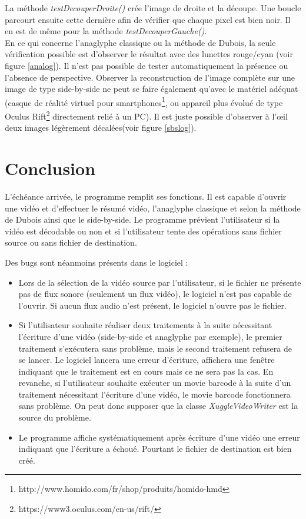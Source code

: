 \documentclass[10pt,a4paper]{article}
\begin{document}
La méthode \textit{testDecouperDroite()} crée l'image de droite et la découpe. Une boucle parcourt ensuite cette dernière afin de vérifier que chaque pixel est bien noir. Il en est de même pour la méthode \textit{testDecouperGauche()}.\\

En ce qui concerne l'anaglyphe classique ou la méthode de Dubois, la seule vérification possible est d'observer le résultat avec des lunettes rouge/cyan (voir figure \ref{analog}). Il n'est pas possible de tester automatiquement la présence ou l'absence de perspective. Observer la reconstruction de l'image complète sur une image de type side-by-side ne peut se faire également qu'avec le matériel adéquat (casque de réalité virtuel pour smartphones\footnote{http://www.homido.com/fr/shop/produits/homido-hmd}, ou appareil plus évolué de type Oculus Rift\footnote{https://www3.oculus.com/en-us/rift/} directement relié à un PC). Il est juste possible d'observer à l'œil deux images légèrement décalées(voir figure \ref{sbslog}).

\newpage
\section{Conclusion}

L'échéance arrivée, le programme remplit ses fonctions. Il est capable d'ouvrir une vidéo et d'effectuer le résumé vidéo, l'anaglyphe classique et selon la méthode de Dubois ainsi que le side-by-side. Le programme prévient l'utilisateur si la vidéo est décodable ou non et si l'utilisateur tente des opérations sans fichier source ou sans fichier de destination.

Des bugs sont néanmoins présents dans le logiciel :\\
\begin{itemize}

\item Lors de la sélection de la vidéo source par l'utilisateur, si le fichier ne présente pas de flux sonore (seulement un flux vidéo), le logiciel n'est pas capable de l'ouvrir. Si aucun flux audio n'est présent, le logiciel n'ouvre pas le fichier.
\item Si l'utilisateur souhaite réaliser deux traitements à la suite nécessitant l'écriture d'une vidéo (side-by-side et anaglyphe par exemple), le premier traitement s'exécutera sans problème, mais le second traitement refusera de se lancer. Le logiciel lancera une erreur d'écriture, affichera une fenêtre indiquant que le traitement est en cours mais ce ne sera pas la cas. En revanche, si l'utilisateur souhaite exécuter un movie barcode à la suite d'un traitement nécessitant l'écriture d'une vidéo, le movie barcode fonctionnera sans problème. On peut donc supposer que la classe \textit{XuggleVideoWriter} est la source du problème.
\item Le programme affiche systématiquement après écriture d'une vidéo une erreur indiquant que l'écriture a échoué. Pourtant le fichier de destination est bien créé.\\

\end{itemize}
\end{document}
